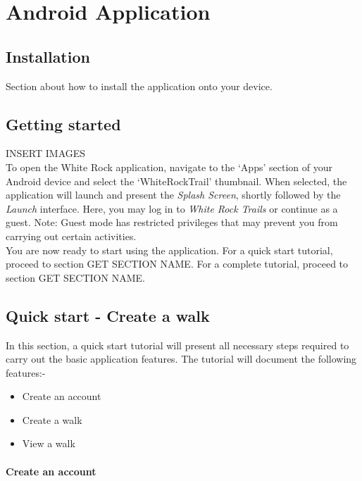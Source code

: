 \documentclass[11pt,a4paper]{report}
\begin{document}
\section{Android Application}
\label{user_manual_application}

\subsection{Installation}

Section about how to install the application onto your device.

\subsection{Getting started}

INSERT IMAGES\\

To open the White Rock application, navigate to the `Apps' section of your Android device and select the `WhiteRockTrail' thumbnail. When selected, the application will launch and present the \emph{Splash Screen}, shortly followed by the \emph{Launch} interface. Here, you may log in to \emph{White Rock Trails} or continue as a guest. Note: Guest mode has restricted privileges that may prevent you from carrying out certain activities.\\

You are now ready to start using the application. For a quick start tutorial, proceed to section GET SECTION NAME. For a complete tutorial, proceed to section GET SECTION NAME. 

\subsection{Quick start - Create a walk}

In this section, a quick start tutorial will present all necessary steps required to carry out the basic application features. The tutorial will document the following features:-

 \begin{itemize}
   \item Create an account
   \item Create a walk
   \item View a walk
 \end{itemize}

\paragraph*{Create an account}\mbox{}\\
\end{document}
